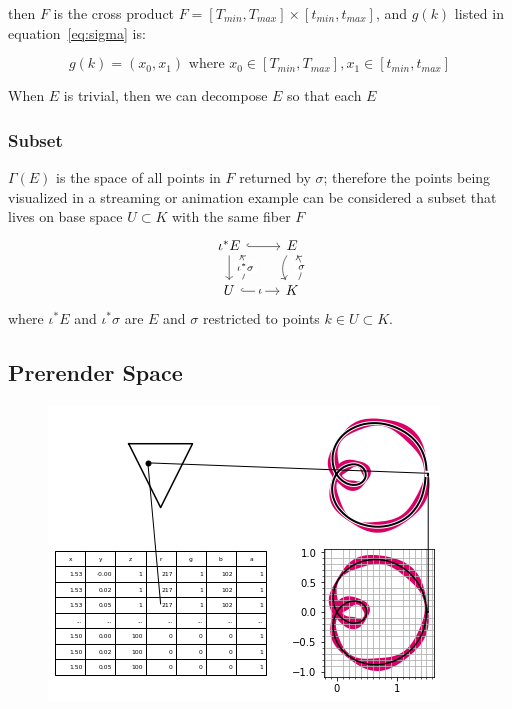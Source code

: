 \documentclass[../main.tex]{subfiles}
\begin{document}
then $F$ is the cross product $F= [T_{min}, T_{max}] \times [t_{min}, t_{max}]$, and $g(k)$ listed in equation~\ref{eq:sigma} is:

\begin{equation}
g(k) = (x_0, x_1) \text{ where } x_0 \in [T_{min}, T_{max}], x_1 \in [t_{min}, t_{max}]
\end{equation}



When $E$ is trivial, then we can decompose $E$ so that each $E$ 


\subsubsection{Subset}
$\Gamma(E)$ is the space of all points in $F$ returned by $\sigma$; therefore the points being visualized in a streaming or animation example can be considered a subset that lives on base space $U \subset K$ with the same fiber $F$
\begin{equation}
    \begin{tikzcd}
        \iota^\ast E \arrow[r, hook] \arrow[d]                                                                       & E \arrow[d, bend right]                       \\
        U \arrow[r, "\iota" description, hook] \arrow[u, "\iota^\ast \sigma" description, bend right, shift right=2] & K \arrow[u, "\sigma" description, bend right]
    \end{tikzcd}    
\end{equation}
where $\iota^*E$ and $\iota^*\sigma$ are $E$ and $\sigma$ restricted to points $k \in U \subset K$.   


\subsection{Prerender Space}
\label{sec:display}

\begin{figure}[h]
    \includegraphics[width=.4\linewidth]{figures/sections/math/render.png}
    \caption{}
    \label{fig:render}
\end{figure}
\end{document}
